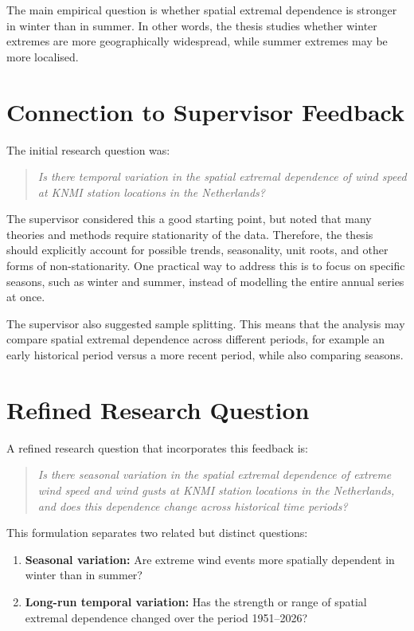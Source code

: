 \documentclass[11pt,a4paper]{article}
\begin{document}
The main empirical question is whether spatial extremal dependence is stronger in winter than in summer. In other words, the thesis studies whether winter extremes are more geographically widespread, while summer extremes may be more localised.

\section{Connection to Supervisor Feedback}

The initial research question was:

\begin{quote}
    \emph{Is there temporal variation in the spatial extremal dependence of wind speed at KNMI station locations in the Netherlands?}
\end{quote}

The supervisor considered this a good starting point, but noted that many theories and methods require stationarity of the data. Therefore, the thesis should explicitly account for possible trends, seasonality, unit roots, and other forms of non-stationarity. One practical way to address this is to focus on specific seasons, such as winter and summer, instead of modelling the entire annual series at once.

The supervisor also suggested sample splitting. This means that the analysis may compare spatial extremal dependence across different periods, for example an early historical period versus a more recent period, while also comparing seasons.

\section{Refined Research Question}

A refined research question that incorporates this feedback is:

\begin{quote}
    \emph{Is there seasonal variation in the spatial extremal dependence of extreme wind speed and wind gusts at KNMI station locations in the Netherlands, and does this dependence change across historical time periods?}
\end{quote}

This formulation separates two related but distinct questions:

\begin{enumerate}[label=\arabic*.]
    \item \textbf{Seasonal variation:} Are extreme wind events more spatially dependent in winter than in summer?
    \item \textbf{Long-run temporal variation:} Has the strength or range of spatial extremal dependence changed over the period 1951--2026?
\end{enumerate}
\end{document}

